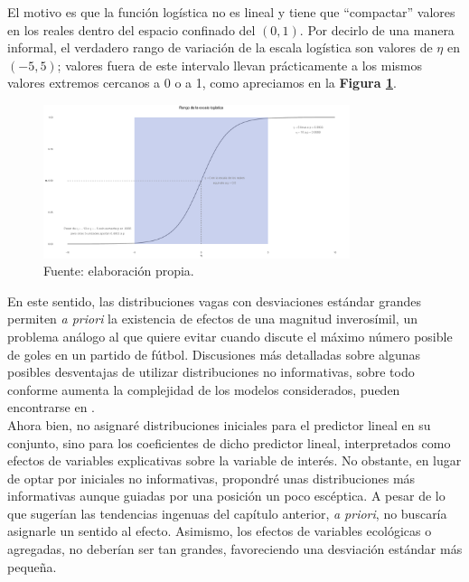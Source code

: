 El motivo es que la función logística no es lineal y tiene que ``compactar'' valores en los reales dentro del espacio confinado del $\left(0,1\right)$. Por decirlo de una manera informal, el verdadero rango de variación de la escala logística son valores de $\eta$ en $(-5,5)$; valores fuera de este intervalo llevan prácticamente a los mismos valores extremos cercanos a 0 o a 1, como apreciamos en la \textbf{Figura \ref{fig:Escala_Logis}}.\\

\begin{figure}[H]
	\centering
	\includegraphics[width = 0.8\textwidth]{Figs/Modelado/Escala_Logis}
	\caption{Fuente: elaboración propia.}
	\label{fig:Escala_Logis}
\end{figure}

En este sentido, las distribuciones vagas con desviaciones estándar grandes permiten \textit{a priori} la existencia de efectos de una magnitud inverosímil, un problema análogo al que \textcite{Regueiro12} quiere evitar cuando discute el máximo número posible de goles en un partido de fútbol. Discusiones más detalladas sobre algunas posibles desventajas de utilizar distribuciones no informativas, sobre todo conforme aumenta la complejidad de los modelos considerados, pueden encontrarse en \textcites{PriorLikelihood17}{BetancourtStanShapePriors}{BlogSimpson}.\\

Ahora bien, no asignaré distribuciones iniciales para el predictor lineal en su conjunto, sino para los coeficientes de dicho predictor lineal, interpretados como efectos de variables explicativas sobre la variable de interés. No obstante, en lugar de optar por iniciales no informativas, propondré unas distribuciones más informativas aunque guiadas por una posición un poco escéptica. A pesar de lo que sugerían las tendencias ingenuas del capítulo anterior, \textit{a priori}, no buscaría asignarle un sentido al efecto. Asimismo, los efectos de variables ecológicas o agregadas, no deberían ser tan grandes, favoreciendo una desviación estándar más pequeña.\\ 

